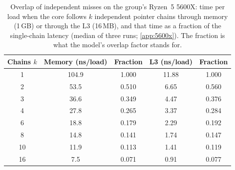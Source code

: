 \begin{table}[htbp]
  \centering
  \caption[Overlap of independent misses on the group's Ryzen~5 5600X]{Overlap of independent misses on the group's Ryzen~5 5600X: time per load when the core follows $k$ independent pointer chains through memory (1\,GB) or through the L3 (16\,MB), and that time as a fraction of the single-chain latency (median of three runs; \cref{app:5600x}). The fraction is what the model's overlap factor stands for.}
  \label{tab:m5600x-mlp}
  \small
  \begin{tabular}{@{}ccccc@{}}
    \toprule
    \textbf{Chains $k$} & \textbf{Memory (ns/load)} & \textbf{Fraction} & \textbf{L3 (ns/load)} & \textbf{Fraction} \\
    \midrule
    1 & 104.9 & 1.000 & 11.88 & 1.000 \\
    2 & 53.5 & 0.510 & 6.65 & 0.560 \\
    3 & 36.6 & 0.349 & 4.47 & 0.376 \\
    4 & 27.8 & 0.265 & 3.37 & 0.284 \\
    6 & 18.8 & 0.179 & 2.29 & 0.192 \\
    8 & 14.8 & 0.141 & 1.74 & 0.147 \\
    10 & 11.9 & 0.113 & 1.41 & 0.119 \\
    16 & 7.5 & 0.071 & 0.91 & 0.077 \\
    \bottomrule
  \end{tabular}
\end{table}

